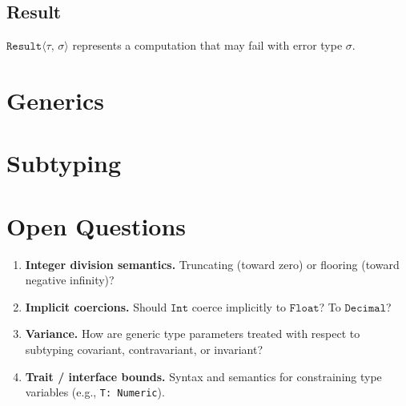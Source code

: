 \documentclass[11pt, letterpaper]{article}
\newcommand{\typ}{\tau}             %
\newcommand{\typB}{\sigma}          %
\newcommand{\tInt}{\mathtt{Int}}
\newcommand{\tFloat}{\mathtt{Float}}
\newcommand{\tDecimal}{\mathtt{Decimal}}
\newcommand{\tResult}[2]{\mathtt{Result}\langle#1,\,#2\rangle}
\begin{document}

\subsection{Result}

$\tResult{\typ}{\typB}$ represents a computation that may fail with error type $\typB$.


\section{Generics}


\section{Subtyping}


\section{Open Questions}
\label{sec:open}

\begin{enumerate}[label=\textbf{Q\arabic*.}]
  \item \textbf{Integer division semantics.} Truncating (toward zero) or flooring
        (toward negative infinity)?
  \item \textbf{Implicit coercions.} Should $\tInt$ coerce implicitly to
        $\tFloat$? To $\tDecimal$?
  \item \textbf{Variance.} How are generic type parameters treated with respect
        to subtyping  covariant, contravariant, or invariant?
  \item \textbf{Trait / interface bounds.} Syntax and semantics for constraining
        type variables (e.g., \lstinline|T: Numeric|).
\end{enumerate}

\end{document}
